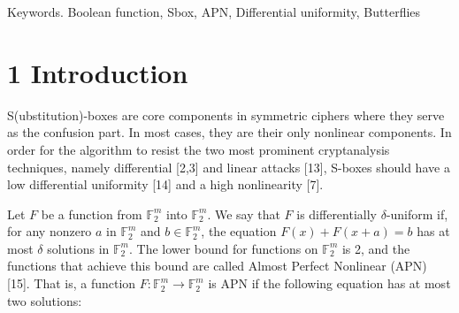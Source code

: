 \documentclass[10pt]{article}
\begin{document}
\begin{abstract}
Whether there exist Almost Perfect Non-linear permutations (APN) operating on an even number of bit is the so-called Big APN Problem. It has been solved in the 6-bit case by Dillon et al. in 2009 but, since then, the general case has remained an open problem.\\
In 2016, Perrin et al. discovered the butterfly structure which contains Dillon et al.'s permutation over $\mathbb{F}_{2^{6}}$. Later, Canteaut et al. generalised this structure and proved that no other butterflies with exponent 3 can be APN. Recently, Yongqiang et al. further generalized the structure with Gold exponent and obtained more differentially 4-uniform permutations with the optimal nonlinearity. However, the existence of more APN permutations in their generalization was left as an open problem.\\
In this paper, we adapt the proof technique of Canteaut et al. to handle all Gold exponents and prove that a generalised butterfly with Gold exponents over $\mathbb{F}_{2^{2 n}}$ can never be APN when $n>3$. More precisely, we prove that such a generalised butterfly being APN implies that the branch size is strictly smaller than 5 . Hence, the only APN butterflies operate on 3-bit branches, i.e. on 6 bits in total.
\end{abstract}

Keywords. Boolean function, Sbox, APN, Differential uniformity, Butterflies

\section*{1 Introduction}
S(ubstitution)-boxes are core components in symmetric ciphers where they serve as the confusion part. In most cases, they are their only nonlinear components. In order for the algorithm to resist the two most prominent cryptanalysis techniques, namely differential [2,3] and linear attacks [13], S-boxes should have a low differential uniformity [14] and a high nonlinearity [7].

Let $F$ be a function from $\mathbb{F}_{2}^{m}$ into $\mathbb{F}_{2}^{m}$. We say that $F$ is differentially $\delta$-uniform if, for any nonzero $a$ in $\mathbb{F}_{2}^{m}$ and $b \in \mathbb{F}_{2}^{m}$, the equation $F(x)+F(x+a)=b$ has at most $\delta$ solutions in $\mathbb{F}_{2}^{m}$. The lower bound for functions on $\mathbb{F}_{2}^{m}$ is 2, and the functions that achieve this bound are called Almost Perfect Nonlinear (APN) [15]. That is, a function $F: \mathbb{F}_{2}^{m} \rightarrow \mathbb{F}_{2}^{m}$ is APN if the following equation has at most two solutions:
\end{document}
